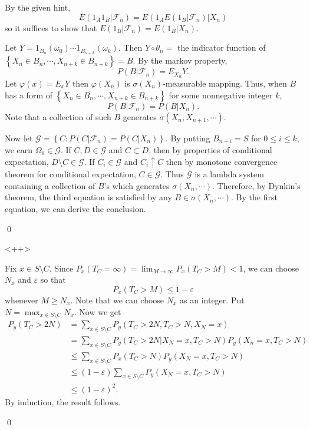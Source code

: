 \begin{problem}[5.2.1] \hfill

	By the given hint,
	\[
		E(1_A 1_B \lvert \mathcal{F}_n) = E(1_A E(1_B \lvert \mathcal{F}_n) \lvert X_n)
	\]
	so it suffices to show that $E(1_B \lvert \mathcal{F}_n) = E(1_B \lvert X_n)$.

	Let $Y = 1_{B_n}(\omega_0) \cdots 1_{B_{n+k}}(\omega_k)$.
	Then $Y \circ \theta_n =$ the indicator function of $\left\{ X_n \in B_n , \cdots, X_{n+k} \in B_{n+k} \right\} = B$.
	By the markov property,
	\[
		P(B\lvert \mathcal{F}_n) = E_{X_n}Y.
	\]
	Let $\varphi(x) = E_x Y$ then $\varphi(X_n)$ is $\sigma(X_n)$-measurable mapping.
	Thus, when $B$ has a form of $\left\{ X_n \in B_n, \cdots, X_{n+k} \in B_{n+k} \right\}$ for some nonnegative integer $k$,
	\[
		P(B\lvert \mathcal{F}_n) = P(B\lvert X_n).
	\]
	Note that a collection of such $B$ generates $\sigma(X_n, X_{n+1}, \cdots)$.

	Now let $\mathcal{G} = \left\{ C: P(C\lvert \mathcal{F}_n) = P(C\lvert X_n) \right\}$.
	By putting $B_{n+i} = S$ for $0 \leq i \leq k$, we earn $\Omega_0 \in \mathcal{G}$.
	If $C, D \in \mathcal{G}$ and $C \subset D$, then by properties of conditional expectation, $D\setminus C \in \mathcal{G}$.
	If $C_i \in \mathcal{G}$ and $C_i \uparrow C$ then by monotone convergence theorem for conditional expectation, $C \in \mathcal{G}$.
	Thus $\mathcal{G}$ is a lambda system containing a collection of $B$'s which generates $\sigma(X_n, \cdots)$.
	Therefore, by Dynkin's theorem, the third equation is satisfied by any $B \in \sigma(X_n, \cdots)$.
	By the first equation, we can derive the conclusion.

	\qed
\end{problem}

\begin{problem}[5.2.4]\hfill
	
\end{problem}<++>

\begin{problem}[5.2.6]\hfill

	Fix $x \in S \setminus C$.
	Since $P_x(T_C = \infty) = \lim_{M\rightarrow \infty} P_x(T_C > M) < 1$, we can choose $N_x$ and $\varepsilon$ so that
	\[
		P_x(T_C > M) \leq 1-\varepsilon
	\]
	whenever $M \geq N_x$. Note that we can choose $N_x$ as an integer.
	Put $N = \max_{x \in S\setminus C} N_x$.
	Now we get
	\[
		\begin{split}
			P_y(T_C > 2N) & = \sum_{x\in S\setminus C} P_y(T_C > 2N, T_C>N, X_N = x) \\
			& = \sum_{x\in S\setminus C} P_y\left( T_C > 2N \lvert X_N = x, T_C > N \right)P_y(X_n = x, T_C > N) \\
			& \leq \sum_{x\in S\setminus C} P_x(T_C > N) P_y(X_N = x, T_C >N) \\
			& \leq (1-\varepsilon)\sum_{x \in S\setminus C}P_y(X_N = x, T_C > N) \\
			& \leq (1-\varepsilon)^2.
		\end{split}
	\]
	By induction, the result follows.

	\qed
\end{problem}

